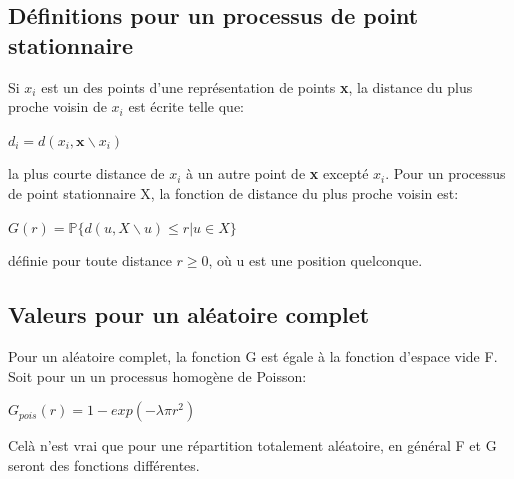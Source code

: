 \documentclass[french,12pt,a4paper]{report}
\begin{document}
\subsection{Définitions pour un processus de point stationnaire}
Si \begin{math}x_i\end{math} est un des points d'une représentation de points \textbf{x}, la distance du plus proche voisin de  \begin{math}x_i\end{math} est écrite telle que:
\begin{center}\begin{math} d_i = d(x_i,\textbf{x}\backslash x_i ) \end{math}\end{center}
la plus courte distance de \begin{math} x_i \end{math} à un autre point de \textbf{x} excepté \begin{math} x_i \end{math}.
Pour un processus de point stationnaire X, la fonction de distance du plus proche voisin est:
\begin{center}\begin{math} G(r) = \mathbb{P}\{ d(u,X\backslash u) \leq r | u \in X\} \end{math}\end{center}
définie pour toute distance \begin{math} r \geq 0 \end{math}, où u est une position quelconque.\\


\subsection{Valeurs pour un aléatoire complet}

Pour un aléatoire complet, la fonction G est égale à la fonction d'espace vide F. Soit pour un un processus homogène de Poisson: 
\begin{center}\begin{math} G_{pois}(r) = 1 - exp(-\lambda \pi r^2) \end{math}\end{center}
Celà n'est vrai que pour une répartition totalement aléatoire, en général F et G seront des fonctions différentes.\\

\end{document}
